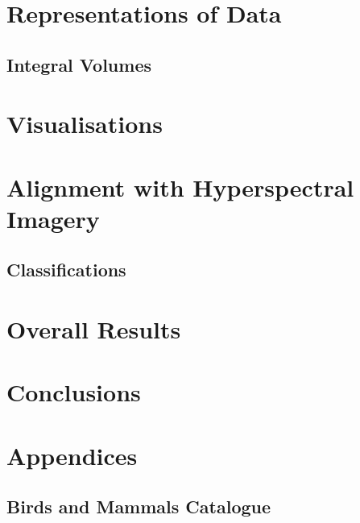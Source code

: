 \documentclass[11pt]{report}
\begin{document}
    \chapter{Representations of Data}\label{Representations}
	    
	    \newpage
		 \section{Integral Volumes}\label{Rep_IntegralVolumes}
		 	
		 		\newpage
		 		
	\chapter{Visualisations}\label{Visualisations}
		
		\newpage
	\chapter{Alignment with Hyperspectral Imagery}\label{Alignment}
		
		\newpage		
		\section{Classifications}\label{Classifications}
			
			\newpage
	\chapter{Overall Results}\label{Results}
		
		\newpage
	\chapter{Conclusions}\label{Conclusions}
		
		\newpage

	    
	    {}

		\newpage
	\chapter{Appendices}\label{Apendices}
		\section{Birds and Mammals Catalogue} 
		\label{AppendixBirds}
		\newpage
	
		
	
    
\end{document}
